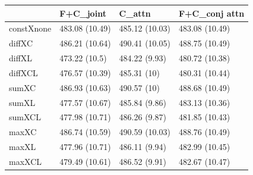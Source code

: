 \begin{tabular}{llll}
& F+C_{joint} & C_{attn} & F+C_{conj attn} \\ 
\hline 
constXnone & 483.08 (10.49) & 485.12 (10.03) & 483.08 (10.49) \\ 
diffXC & 486.21 (10.64) & 490.41 (10.05) & 488.75 (10.49) \\ 
diffXL & 473.22 (10.5) & 484.22 (9.93) & 480.72 (10.38) \\ 
diffXCL & 476.57 (10.39) & 485.31 (10) & 480.31 (10.44) \\ 
sumXC & 486.93 (10.63) & 490.57 (10) & 488.68 (10.49) \\ 
sumXL & 477.57 (10.67) & 485.84 (9.86) & 483.13 (10.36) \\ 
sumXCL & 477.98 (10.71) & 486.26 (9.87) & 481.85 (10.43) \\ 
maxXC & 486.74 (10.59) & 490.59 (10.03) & 488.76 (10.49) \\ 
maxXL & 477.96 (10.71) & 486.11 (9.94) & 482.99 (10.45) \\ 
maxXCL & 479.49 (10.61) & 486.52 (9.91) & 482.67 (10.47) \\ 
\hline 
\end{tabular}
